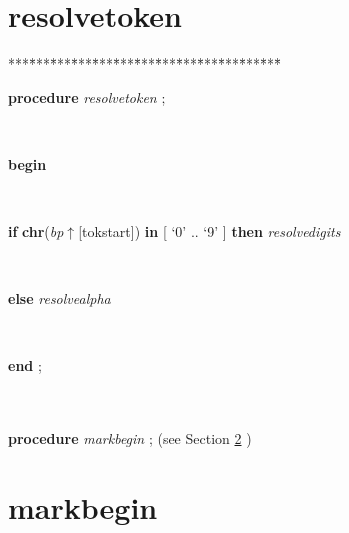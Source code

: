 \section{resolvetoken}\label{sec:csvfilereader/getdatamatrix/recursedown/recurse/getcolheaders/recurse/getrowheaders/recurse/colcount/getcell/removetrailingnull/onlynulls/rowcount/isint/printcsv/parsecsvfile/thetoken/peek/isoneof/nextsymbol/have/haveoneof/initialise/resolvealpha/resolvedigitsresolvetoken}

\begin{tabbing}
***\=***\=***\=***\=***\=***\=***\=***\=***\=***\=***\=***\=***\=\kill
\parbox{14cm}{\textsf{\textbf{procedure}  \textit{resolvetoken} ;}}\\
\+\parbox{14cm}{\textsf{\textbf{begin} }}\\
\+\parbox{14cm}{\textsf {\textbf {if } \textsf{\textbf{chr}(\textit{bp}$\uparrow$\textit{}[tokstart])} \textbf{ in } \textsf{\textit{}[\textrm{\textup { `0' } }..\textrm{\textup { `9' } }]} \textbf{ then } \textsf{\textit{resolvedigits}}}}\\
\<\parbox{14cm}{\textsf {\textbf {else } \textsf{\textit{resolvealpha}}}}\\
\<\-\<\-\parbox{14cm}{\textsf{\textbf{end} ;}}\\
\\
\+\textsf{\textbf{procedure}  \textit{markbegin} ;} (see Section \ref{sec:csvfilereader/getdatamatrix/recursedown/recurse/getcolheaders/recurse/getrowheaders/recurse/colcount/getcell/removetrailingnull/onlynulls/rowcount/isint/printcsv/parsecsvfile/thetoken/peek/isoneof/nextsymbol/have/haveoneof/initialise/resolvealpha/resolvedigits/resolvetokenmarkbegin} )\\
\end{tabbing}
\section{markbegin}\label{sec:csvfilereader/getdatamatrix/recursedown/recurse/getcolheaders/recurse/getrowheaders/recurse/colcount/getcell/removetrailingnull/onlynulls/rowcount/isint/printcsv/parsecsvfile/thetoken/peek/isoneof/nextsymbol/have/haveoneof/initialise/resolvealpha/resolvedigits/resolvetokenmarkbegin}


